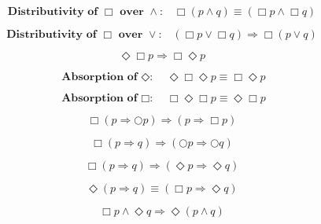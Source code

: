 \documentclass[fleqn, leqno]{article}
\newcommand{\next}{\bigcirc}
\newcommand{\event}{\Diamond}
\newcommand{\always}{\Box}
\newcommand{\spacer}{\vspace{-30pt}}
\begin{document}
\spacer

\begin{equation}\label{E:distAlwaysAnd}
\textbf{Distributivity of $\always$ over $\land$:}\quad \always (p \land q) \equiv (\always p \land \always q)
\end{equation}

\spacer

\begin{equation}\label{E:distAlwaysOr}
\textbf{Distributivity of $\always$ over $\lor$:}\quad (\always p \lor \always q) \Rightarrow \always (p \lor q)
\end{equation}

\spacer

\begin{equation}\label{E:eventAlwaysImp}
\event\always p \Rightarrow \always\event p
\end{equation}

\spacer

\begin{equation}\label{E:absEvent}
\textbf{Absorption of $\event$:}\quad \event\always\event p \equiv \always\event p
\end{equation}

\spacer

\begin{equation}\label{E:absAlways}
\textbf{Absorption of $\always$:}\quad \always\event\always p \equiv \event\always p
\end{equation}

\spacer

\begin{equation}\label{E:alwaysImpNext}
\always (p \Rightarrow \next p) \Rightarrow (p \Rightarrow \always p)
\end{equation}

\spacer

\begin{equation}\label{E:alwaysImpNexts}
\always (p \Rightarrow q) \Rightarrow (\next p \Rightarrow \next q)
\end{equation}

\spacer

\begin{equation}\label{E:alwaysImpEvents}
\always (p \Rightarrow q) \Rightarrow (\event p \Rightarrow \event q)
\end{equation}

\spacer

\begin{equation}\label{E:eventImpAlways}
\event (p \Rightarrow q) \equiv (\always p \Rightarrow \event q)
\end{equation}

\spacer

\begin{equation}\label{E:alwaysAndEvent}
\always p \land \event q \Rightarrow \event (p \land q)
\end{equation}
\end{document}
